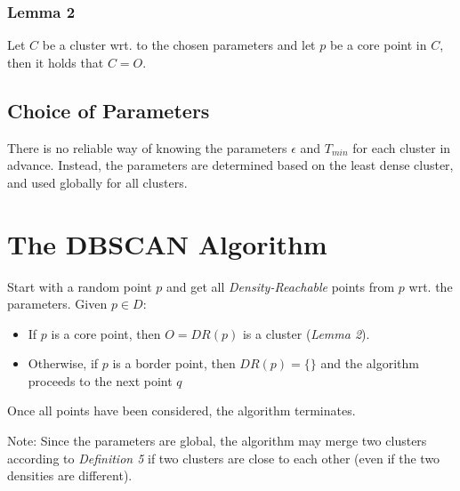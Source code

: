 \subsubsection*{Lemma 2}
Let $C$ be a cluster wrt. to the chosen parameters and let $p$ be a core point in $C$, then it holds that $C = O$.

\subsection{Choice of Parameters}
There is no reliable way of knowing the parameters $\epsilon$ and $T_{min}$ for each cluster in advance. Instead, the parameters are determined based on the least dense cluster, and used globally for all clusters.

\section{The DBSCAN Algorithm}
Start with a random point $p$ and get all \textit{Density-Reachable} points from $p$ wrt. the parameters.
Given $p \in D$: 
\begin{itemize}
\item If $p$ is a core point, then $O = DR(p)$ is a cluster (\textit{Lemma 2}).
\item Otherwise, if $p$ is a border point, then $DR(p) = \{\}$ and the algorithm proceeds to the next point $q$
\end{itemize}
Once all points have been considered, the algorithm terminates. 

Note: Since the parameters are global, the algorithm may merge two clusters according to \textit{Definition 5} if two clusters are close to each other (even if the two densities are different).
